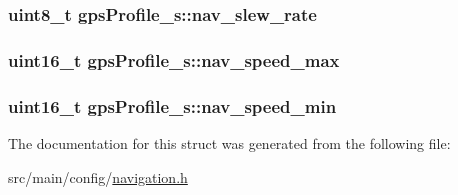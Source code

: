 \hypertarget{structgpsProfile__s_af86518e66d9ed148d7c3893d86e4e11f}{
\subsubsection[{nav\+\_\+slew\+\_\+rate}]{\setlength{\rightskip}{0pt plus 5cm}uint8\+\_\+t gps\+Profile\+\_\+s\+::nav\+\_\+slew\+\_\+rate}}\label{structgpsProfile__s_af86518e66d9ed148d7c3893d86e4e11f}
\hypertarget{structgpsProfile__s_a08d6cd9904c42f41a117d025fdf5c9dc}{
\subsubsection[{nav\+\_\+speed\+\_\+max}]{\setlength{\rightskip}{0pt plus 5cm}uint16\+\_\+t gps\+Profile\+\_\+s\+::nav\+\_\+speed\+\_\+max}}\label{structgpsProfile__s_a08d6cd9904c42f41a117d025fdf5c9dc}
\hypertarget{structgpsProfile__s_a87765f191812e7e526053ac687537d7e}{
\subsubsection[{nav\+\_\+speed\+\_\+min}]{\setlength{\rightskip}{0pt plus 5cm}uint16\+\_\+t gps\+Profile\+\_\+s\+::nav\+\_\+speed\+\_\+min}}\label{structgpsProfile__s_a87765f191812e7e526053ac687537d7e}


The documentation for this struct was generated from the following file\+:\begin{DoxyCompactItemize}
\item 
src/main/config/\hyperlink{config_2navigation_8h}{navigation.\+h}\end{DoxyCompactItemize}

